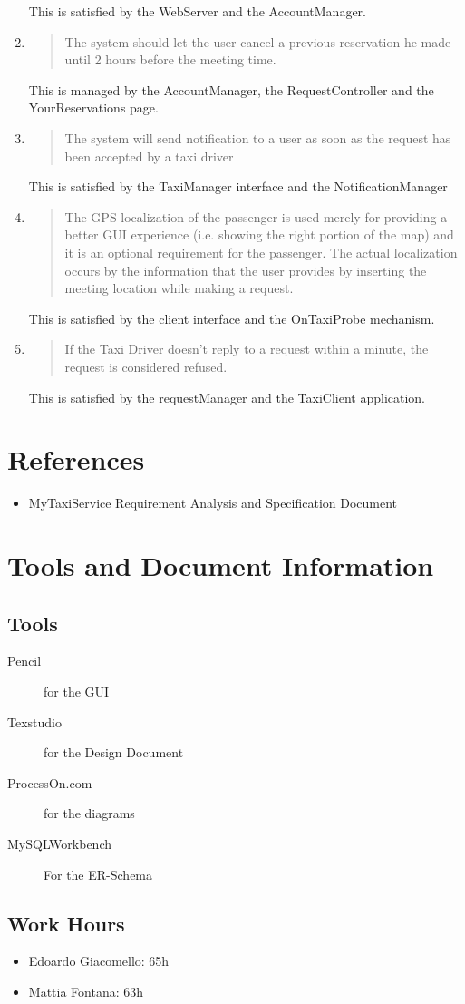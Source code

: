 \documentclass[11pt, a4paper,titlepage]{article}
\newcommand{\productname}{MyTaxiService }
\begin{document}
\begin{enumerate}
\begin{quotation}
		\end{quotation}
			This is satisfied by the WebServer and the AccountManager.
		\item
		\begin{quotation} 
			 The system should let the user cancel a previous reservation he made until 2 hours before the meeting time.
			\end{quotation}
			This is managed by the AccountManager, the RequestController and the YourReservations page.
			\item
			\begin{quotation} 
				 The system will send notification to a user as soon as the request has been accepted by a taxi driver
		\end{quotation}
			This is satisfied by the TaxiManager interface and the NotificationManager
		\item
		\begin{quotation} 
			 The GPS localization of the passenger is used merely for providing a better GUI experience (i.e. showing the right portion of the map) and it is an optional requirement for the passenger. The actual localization occurs by the information that the user provides by inserting the meeting location while making a request.
			\end{quotation}
			This is satisfied by the client interface and the OnTaxiProbe mechanism.
			\item
			\begin{quotation} 
				 If the Taxi Driver doesn't reply to a request within a minute, the request is considered refused.	 
			\end{quotation}
			This is satisfied by the requestManager and the TaxiClient application.
			\end{enumerate}
		
\section{References}
\begin{itemize}
	\item \productname Requirement Analysis and Specification Document
\end{itemize}
\section{Tools and Document Information}
	\subsection{Tools}
	\begin{description}
		\item[Pencil] for the GUI
		\item [Texstudio] for the Design Document
		\item [ProcessOn.com] for the diagrams 
		\item[MySQLWorkbench] For the ER-Schema 
	\end{description}
	\subsection{Work Hours}
	\begin{itemize}
		\item Edoardo Giacomello: 65h
		\item Mattia Fontana: 63h
	\end{itemize}
\end{document}
